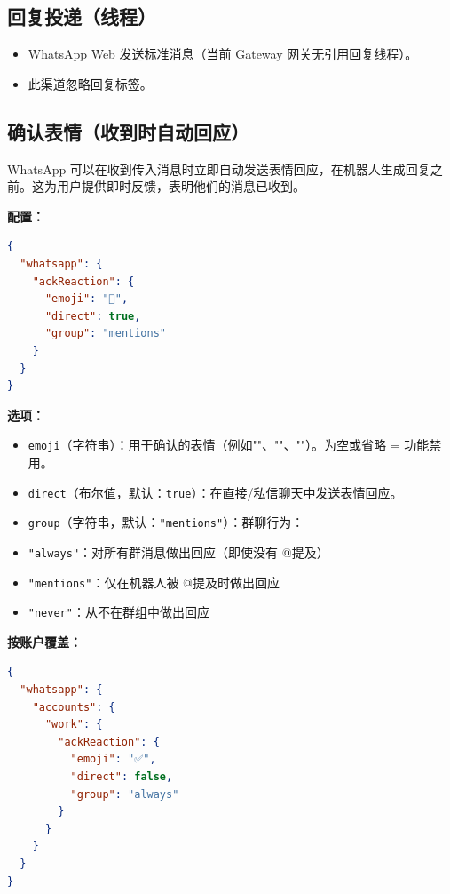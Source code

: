 \subsection{回复投递（线程）}


\begin{itemize}
  \item WhatsApp Web 发送标准消息（当前 Gateway 网关无引用回复线程）。
  \item 此渠道忽略回复标签。
\end{itemize}


\subsection{确认表情（收到时自动回应）}


WhatsApp 可以在收到传入消息时立即自动发送表情回应，在机器人生成回复之前。这为用户提供即时反馈，表明他们的消息已收到。

\textbf{配置：}

\begin{lstlisting}[language=json]
{
  "whatsapp": {
    "ackReaction": {
      "emoji": "👀",
      "direct": true,
      "group": "mentions"
    }
  }
}
\end{lstlisting}


\textbf{选项：}

\begin{itemize}
  \item \texttt{emoji}（字符串）：用于确认的表情（例如""、""、""）。为空或省略 = 功能禁用。
  \item \texttt{direct}（布尔值，默认：\texttt{true}）：在直接/私信聊天中发送表情回应。
  \item \texttt{group}（字符串，默认：\texttt{"mentions"}）：群聊行为：
  \item \texttt{"always"}：对所有群消息做出回应（即使没有 @提及）
  \item \texttt{"mentions"}：仅在机器人被 @提及时做出回应
  \item \texttt{"never"}：从不在群组中做出回应
\end{itemize}


\textbf{按账户覆盖：}

\begin{lstlisting}[language=json]
{
  "whatsapp": {
    "accounts": {
      "work": {
        "ackReaction": {
          "emoji": "✅",
          "direct": false,
          "group": "always"
        }
      }
    }
  }
}
\end{lstlisting}


